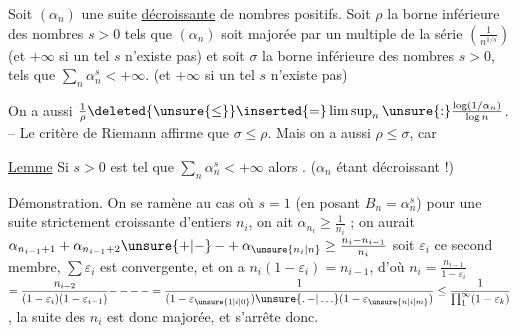 Soit $(\alpha_n)$ une suite \uline{décroissante}  de nombres
positifs. Soit $\rho$ la borne inférieure des nombres
 $s>0$ tels que $(\alpha_n)$ soit majorée par
un multiple de la série $\left(\frac{1}{n^{1/s}}\right)$ (et $+\infty$
si un tel $s$ n'existe pas) et soit $\sigma$ la
borne inférieure des nombres $s>0$, tels que
$\sum_n\alpha_n^s<+\infty$. (et $+\infty$ si un tel $s$ n'existe pas)

On a aussi $\frac1\rho\deleted{\unsure{\leq}}\inserted{=}\limsup_n\unsure{:}\frac{\log(1/\alpha_n)}{\log n}$.  -- Le critère de Riemann affirme
que \deleted{$\unsure{\rho\leq|\rho\leq\sigma}$} $\sigma\leq\rho$. Mais on a aussi $\rho\leq\sigma$,
car 

\uline{Lemme} \quad Si $s>0$ est tel que $\sum_n\alpha_n^s<+\infty$
alors \inserted{$\geq$}  . ($\alpha_n$ étant décroissant !)

Démonstration. On se ramène au cas où $s=1$
(en posant $B_n=\alpha_n^s$)   pour une suite
strictement croissante d'entiers $n_i$, on  ait
$\alpha_{n_i}\geq\frac1{n_i}$ ;  on aurait \quad $\alpha_{n_{i-1}+1}+\alpha_{n_{i-1}+2}\unsure{+|\mathord{-}}\,\mathord{-}+\alpha_{\unsure{n_i|n}}\geq\frac{n_i-n_{i-1}}{n_i}$
soit $\varepsilon_i$ ce second membre, $\sum\varepsilon_i$ est 
convergente, et on a $n_i(1-\varepsilon_i)=n_{i-1}$, d'où $n_i=\frac{n_{i-1}}{1-\varepsilon_i}$
$\displaystyle =\frac{n_{i-2}}{(1-\varepsilon_i)(1-\varepsilon_{i-1})}\mathord{-}\,\mathord{-}\,\mathord{-}\,\mathord{-}=\frac1{(1-\varepsilon_{\unsure{1|i|0}})\unsure{\mathord{.}\,\mathord{-}|\ldots}(1-\varepsilon_{\unsure{n|i|m}})}\leq\frac1{\prod_1^\infty(1-\varepsilon_k)}$, la suite
des $n_i$ est donc majorée, et s'arrête donc.
